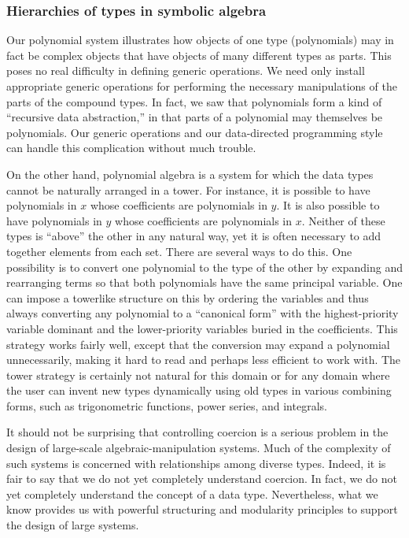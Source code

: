 \subsubsection*{Hierarchies of types in symbolic algebra}

Our polynomial system illustrates how objects of one type (polynomials) may in
fact be complex objects that have objects of many different types as parts.
This poses no real difficulty in defining generic operations.  We need only
install appropriate generic operations for performing the necessary
manipulations of the parts of the compound types.  In fact, we saw that
polynomials form a kind of ``recursive data abstraction,'' in that parts of a
polynomial may themselves be polynomials.  Our generic operations and our
data-directed programming style can handle this complication without much
trouble.

On the other hand, polynomial algebra is a system for which the data types
cannot be naturally arranged in a tower.  For instance, it is possible to have
polynomials in \( x \) whose coefficients are polynomials in \( y \).  It is also
possible to have polynomials in \( y \) whose coefficients are polynomials in
\( x \).  Neither of these types is ``above'' the other in any natural way, yet
it is often necessary to add together elements from each set.  There are
several ways to do this.  One possibility is to convert one polynomial to the
type of the other by expanding and rearranging terms so that both polynomials
have the same principal variable.  One can impose a towerlike structure on this
by ordering the variables and thus always converting any polynomial to a
``canonical form'' with the highest-priority variable dominant and the
lower-priority variables buried in the coefficients.  This strategy works
fairly well, except that the conversion may expand a polynomial unnecessarily,
making it hard to read and perhaps less efficient to work with.  The tower
strategy is certainly not natural for this domain or for any domain where the
user can invent new types dynamically using old types in various combining
forms, such as trigonometric functions, power series, and integrals.

It should not be surprising that controlling coercion is a serious problem in
the design of large-scale algebraic-manipulation systems.  Much of the
complexity of such systems is concerned with relationships among diverse types.
Indeed, it is fair to say that we do not yet completely understand coercion.
In fact, we do not yet completely understand the concept of a data type.
Nevertheless, what we know provides us with powerful structuring and modularity
principles to support the design of large systems.

